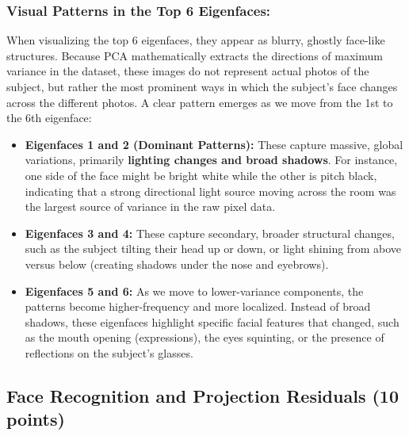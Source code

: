\documentclass[twoside, 10pt]{article}
\begin{document}
\subsubsection{Visual Patterns in the Top 6 Eigenfaces:} When visualizing the top 6 eigenfaces, they appear as blurry, ghostly face-like structures. Because PCA mathematically extracts the directions of maximum variance in the dataset, these images do not represent actual photos of the subject, but rather the most prominent ways in which the subject's face changes across the different photos.
A clear pattern emerges as we move from the 1st to the 6th eigenface:
\begin{itemize}
    \item \textbf{Eigenfaces 1 and 2 (Dominant Patterns):} These capture massive, global variations, primarily \textbf{lighting changes and broad shadows}. For instance, one side of the face might be bright white while the other is pitch black, indicating that a strong directional light source moving across the room was the largest source of variance in the raw pixel data.
    \item \textbf{Eigenfaces 3 and 4:} These capture secondary, broader structural changes, such as the subject tilting their head up or down, or light shining from above versus below (creating shadows under the nose and eyebrows).
    \item \textbf{Eigenfaces 5 and 6:} As we move to lower-variance components, the patterns become higher-frequency and more localized. Instead of broad shadows, these eigenfaces highlight specific facial features that changed, such as the mouth opening (expressions), the eyes squinting, or the presence of reflections on the subject's glasses.
\end{itemize}
\subsection{Face Recognition and Projection Residuals (10 points)}
\end{document}
